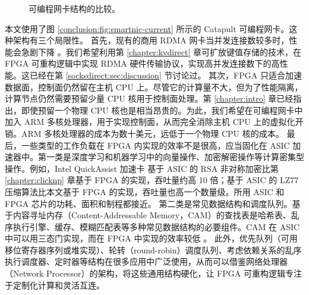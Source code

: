 \begin{figure}[htbp]
	\centering
	\hspace{0.05\textwidth}
	\caption{可编程网卡结构的比较。}
\end{figure}

本文使用了图 \ref{conclusion:fig:smartnic-current} 所示的 Catapult 可编程网卡。这种架构有三个局限性。
首先，现有的商用 RDMA 网卡当并发连接数较多时，性能会急剧下降 \cite{mprdma}。我们希望利用第 \ref{chapter:kvdirect} 章可扩放键值存储的技术，在 FPGA 可重构逻辑中实现 RDMA 硬件传输协议，实现高并发连接数下的高性能。这已经在第 \ref{socksdirect:sec:discussion} 节讨论过。
其次，FPGA 只适合加速数据面，控制面仍然留在主机 CPU 上。尽管它的计算量不大，但为了性能隔离，计算节点仍然需要预留少量 CPU 核用于控制面处理。第 \ref{chapter:intro} 章已经指出，即使预留一个物理 CPU 核也是相当昂贵的。为此，我们希望在可编程网卡中加入 ARM 多核处理器，用于实现控制面，从而完全消除主机 CPU 上的虚拟化开销。ARM 多核处理器的成本为数十美元，远低于一个物理 CPU 核的成本。
最后，一些类型的工作负载在 FPGA 内实现的效率不是很高，应当固化在 ASIC 加速器中。第一类是深度学习和机器学习中的向量操作、加密解密操作等计算密集型操作。例如，Intel QuickAssist 加速卡 \cite{intel-qat} 基于 ASIC 的 RSA 非对称加密比第 \ref{chapter:clicknp} 章基于 FPGA 的实现，吞吐量约高 10 倍；基于 ASIC 的 LZ77 压缩算法比本文基于 FPGA 的实现，吞吐量也高一个数量级。所用 ASIC 和 FPGA 芯片的功耗、面积和制程都接近。
第二类是常见数据结构和调度队列。基于内容寻址内存（Content-Addressable Memory，CAM）的查找表是哈希表、乱序执行引擎、缓存、模糊匹配表等多种常见数据结构的必要组件。CAM 在 ASIC 中可以用三态门实现，而在 FPGA 中实现的效率较低 \cite{wong2011comparing}。
此外，优先队列（可用移位寄存器序列或堆实现）、轮转（round-robin）调度队列、考虑依赖关系的乱序执行调度器、定时器等结构在很多应用中广泛使用，从而可以借鉴网络处理器（Network Processor）的架构，将这些通用结构硬化，让 FPGA 可重构逻辑专注于定制化计算和灵活互连。

